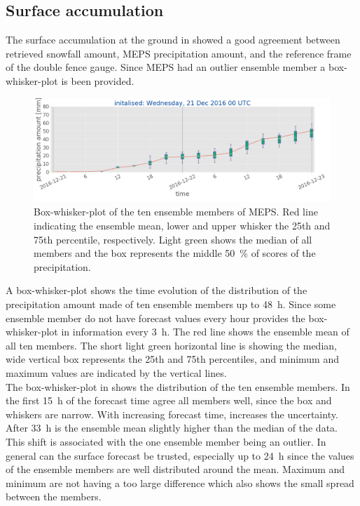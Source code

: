 \subsection{Surface accumulation}\label{sec:2112:surface}
The surface accumulation at the ground in  showed a good agreement between retrieved snowfall amount, MEPS precipitation amount, and the reference frame of the double fence gauge. Since MEPS had an outlier ensemble member a box-whisker-plot is been provided. 
\begin{figure}[t]
	\includegraphics[width=\textwidth]{./fig_boxplot_sfc/20161221_0}
	\caption{Box-whisker-plot of the ten ensemble members of MEPS. Red line indicating the ensemble mean, lower and upper whisker the 25th and 75th percentile, respectively. Light green shows the median of all members and the box represents the middle \SI{50}{\percent} of scores of the precipitation.}\label{fig:boxplt21}
\end{figure}
A box-whisker-plot shows the time evolution of the distribution of the precipitation amount made of ten ensemble members up to \SI{48}{\hour}. Since some ensemble member do not have forecast values every hour provides the box-whisker-plot in  information every \SI{3}{\hour}. The red line shows the ensemble mean of all ten members. The short light green horizontal line is showing the median, wide vertical box represents the 25th and 75th percentiles, and minimum and maximum values are indicated by the vertical lines.
\\
The box-whisker-plot in  shows the distribution of the ten ensemble members. In the first \SI{15}{\hour} of the forecast time agree all members well, since the box and whiskers are narrow. With increasing forecast time, increases the uncertainty. After \SI{33}{\hour} is the ensemble mean slightly higher than the median of the data. This shift is associated with the one ensemble member being an outlier.
In general can the surface forecast be trusted, especially up to \SI{24}{\hour} since the values of the ensemble members are well distributed around the mean. Maximum and minimum are not having a too large difference which also shows the small spread between the members.

